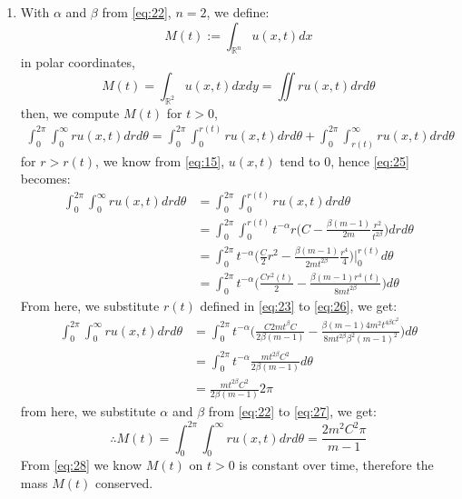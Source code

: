 \documentclass[a4paper,9pt]{article}
\newcommand{\R}{\mathbb{R}}
\begin{document}
\begin{enumerate}
\begin{enumerate}
		\item With $\alpha$ and $\beta$ from \eqref{eq:22}, $n=2$, we define:
		$$M(t):=\int_{\R^n}u(x,t)dx$$
		in polar coordinates,
		$$M(t)=\int_{\R^2}u(x,t)dxdy = \iint r u(x,t)dr d\theta$$
		then, we compute $M(t)$ for $t>0$,
		\begin{equation}\label{eq:25}
		\begin{aligned}
		\int_{0}^{2\pi}\int_{0}^{\infty} r u(x,t)dr d\theta= \int_{0}^{2\pi}\int_{0}^{r(t)} r u(x,t) dr d\theta + \int_{0}^{2\pi}\int_{r(t)}^{\infty} r u(x,t) dr d\theta
		\end{aligned}
		\end{equation}
		for $r>r(t)$, we know from \eqref{eq:15}, $u(x,t)$ tend to $0$, hence \eqref{eq:25} becomes:
		\begin{equation}\label{eq:26}
		\begin{aligned}
		\int_{0}^{2\pi}\int_{0}^{\infty} r u(x,t)dr d\theta&= \int_{0}^{2\pi}\int_{0}^{r(t)} r u(x,t) dr d\theta\\
		&=\int_{0}^{2\pi}\int_{0}^{r(t)} t^{-\alpha} r \bigg( C - \frac{\beta(m-1)}{2m} \frac{r^2}{t^{2\beta}} \bigg) dr d\theta\\
		&=\int_{0}^{2\pi} t^{-\alpha} \bigg( \frac{C}{2} r^2 - \frac{\beta(m-1)}{2m t^{2\beta}} \frac{r^4}{4} \bigg)\Biggr|^{r(t)}_0 d\theta\\
		&=\int_{0}^{2\pi} t^{-\alpha} \bigg( \frac{Cr^2(t)}{2} - \frac{\beta(m-1)r^4(t)}{8m t^{2\beta}} \bigg) d\theta
		\end{aligned}
		\end{equation}
		From here, we substitute $r(t)$ defined in \eqref{eq:23} to \eqref{eq:26}, we get:
		\begin{equation}\label{eq:27}
		\begin{aligned}
		\int_{0}^{2\pi}\int_{0}^{\infty} r u(x,t)dr d\theta&=\int_{0}^{2\pi} t^{-\alpha} \bigg( \frac{C 2mt^{\beta}C}{2\beta(m-1)} - \frac{\beta(m-1)4m^2t^{4\beta C^2}}{8m t^{2\beta}\beta^2(m-1)^2} \bigg) d\theta\\
		&= \int_{0}^{2\pi} t^{-\alpha} \frac{mt^{2\beta}C^2}{2\beta(m-1)} d\theta\\
		&= \frac{mt^{2\beta}C^2}{2\beta(m-1)} 2\pi
		\end{aligned}
		\end{equation}
		from here, we substitute $\alpha$ and $\beta$ from \eqref{eq:22} to \eqref{eq:27}, we get:
		\begin{equation}\label{eq:28}
		\therefore M(t) = \int_{0}^{2\pi}\int_{0}^{\infty} r u(x,t)dr d\theta = \frac{2m^2C^2\pi}{m-1}
		\end{equation}
		From \eqref{eq:28} we know $M(t)$ on $t>0$ is constant over time, therefore the mass $M(t)$ conserved.
	\end{enumerate}
\end{enumerate}
\end{document}
